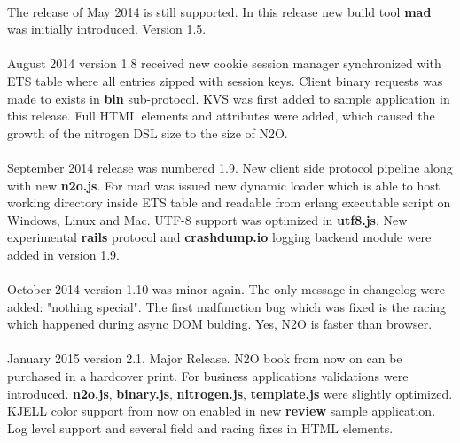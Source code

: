 \paragraph{}
The release of May 2014 is still supported. In this release
new build tool {\bf mad} was initially introduced. Version 1.5.

\newpage
\paragraph{}
August 2014 version 1.8 received new cookie session manager
synchronized with ETS table where all entries zipped with session keys.
Client binary requests was made to exists in {\bf bin} sub-protocol.
KVS was first added to sample application in this release.
Full HTML elements and attributes were added, which caused the growth of
the nitrogen DSL size to the size of N2O.

\paragraph{}
September 2014 release was numbered 1.9.
New client side protocol pipeline along with new {\bf n2o.js}.
For mad was issued new dynamic loader
which is able to host working directory inside ETS table and readable
from erlang executable script on Windows, Linux and Mac. UTF-8 support
was optimized in {\bf utf8.js}. New experimental {\bf rails} protocol and {\bf crashdump.io}
logging backend module were added in version 1.9.

\paragraph{}
October 2014 version 1.10 was minor again. The only message in changelog
were added: "nothing special". The first malfunction bug which was fixed is the
racing which happened during async DOM bulding. Yes, N2O is faster than browser.

\paragraph{}
January 2015 version 2.1. Major Release. N2O book from now
on can be purchased in a hardcover print. For business
applications validations were introduced. {\bf n2o.js}, {\bf binary.js}, {\bf nitrogen.js},
{\bf template.js} were slightly optimized. KJELL color support from now on enabled in
new {\bf review} sample application.
Log level support and several field and racing fixes in HTML elements.

